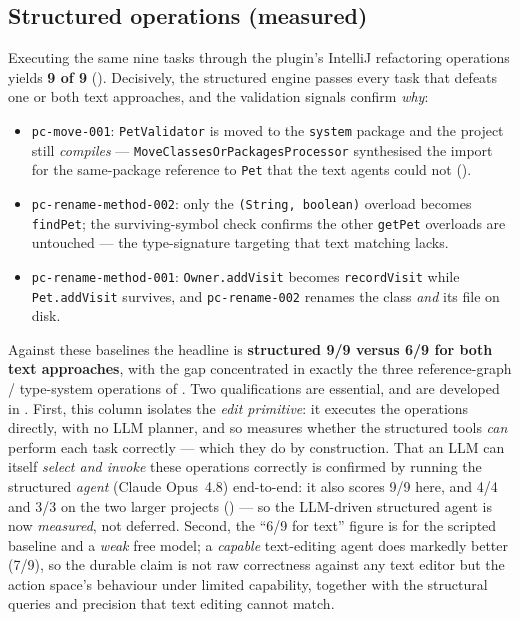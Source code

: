 \subsection{Structured operations (measured)}
Executing the same nine tasks through the plugin's IntelliJ refactoring operations
yields \textbf{9 of 9} (). Decisively, the structured engine
passes every task that defeats one or both text approaches, and the validation
signals confirm \emph{why}:
\begin{itemize}
  \item \texttt{pc-move-001}: \texttt{PetValidator} is moved to the \texttt{system}
    package and the project still \emph{compiles} --- \texttt{MoveClassesOrPackagesProcessor}
    synthesised the import for the same-package reference to \texttt{Pet} that the
    text agents could not ().
  \item \texttt{pc-rename-method-002}: only the \texttt{(String, boolean)} overload
    becomes \texttt{findPet}; the surviving-symbol check confirms the other
    \texttt{getPet} overloads are untouched --- the type-signature targeting that
    text matching lacks.
  \item \texttt{pc-rename-method-001}: \texttt{Owner.addVisit} becomes
    \texttt{recordVisit} while \texttt{Pet.addVisit} survives, and
    \texttt{pc-rename-002} renames the class \emph{and} its file on disk.
\end{itemize}
Against these baselines the headline is \textbf{structured 9/9 versus 6/9 for both
text approaches}, with the gap concentrated in exactly the three reference-graph /
type-system operations of . Two qualifications are essential,
and are developed in . First, this column isolates the
\emph{edit primitive}: it executes the operations directly, with no LLM planner, and so
measures whether the structured tools \emph{can} perform each task correctly --- which
they do by construction. That an LLM can itself \emph{select and invoke} these
operations correctly is confirmed by running the structured \emph{agent} (Claude
Opus~4.8) end-to-end: it also scores 9/9 here, and 4/4 and 3/3 on the two larger
projects () --- so the LLM-driven structured agent is now
\emph{measured}, not deferred. Second, the ``6/9 for text'' figure is for the scripted
baseline and a \emph{weak} free model; a \emph{capable} text-editing agent does
markedly better (7/9), so the durable claim is not raw correctness against any text
editor but the action space's behaviour under limited capability, together with the
structural queries and precision that text editing cannot match.

